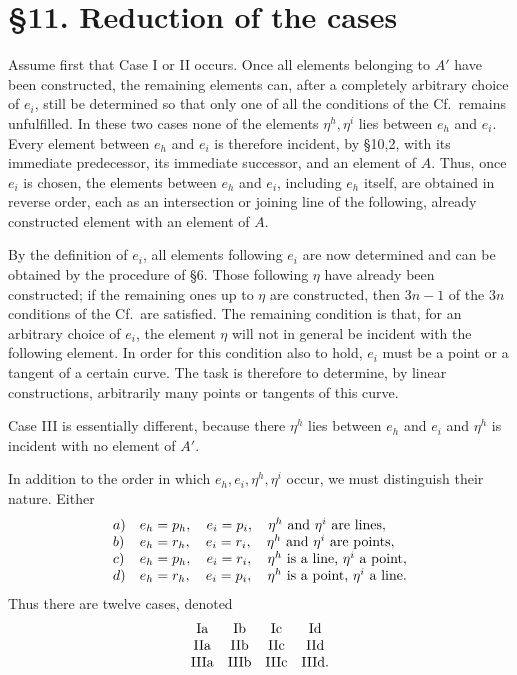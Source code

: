 \documentclass[11pt]{article}
\newcommand{\Cf}{\textup{Cf.}}
\begin{document}
\section*{\S 11. Reduction of the cases}
Assume first that Case I or II occurs. Once all elements belonging to $A'$ have been constructed, the remaining elements can, after a completely arbitrary choice of $e_i$, still be determined so that only one of all the conditions of the \Cf\ remains unfulfilled. In these two cases none of the elements $\eta^h,\eta^i$ lies between $e_h$ and $e_i$. Every element between $e_h$ and $e_i$ is therefore incident, by \S 10,2, with its immediate predecessor, its immediate successor, and an element of $A$. Thus, once $e_i$ is chosen, the elements between $e_h$ and $e_i$, including $e_h$ itself, are obtained in reverse order, each as an intersection or joining line of the following, already constructed element with an element of $A$.

By the definition of $e_i$, all elements following $e_i$ are now determined and can be obtained by the procedure of \S 6. Those following $\eta$ have already been constructed; if the remaining ones up to $\eta$ are constructed, then $3n-1$ of the $3n$ conditions of the \Cf\ are satisfied. The remaining condition is that, for an arbitrary choice of $e_i$, the element $\eta$ will not in general be incident with the following element. In order for this condition also to hold, $e_i$ must be a point or a tangent of a certain curve. The task is therefore to determine, by linear constructions, arbitrarily many points or tangents of this curve.

Case III is essentially different, because there $\eta^h$ lies between $e_h$ and $e_i$ and $\eta^h$ is incident with no element of $A'$.

In addition to the order in which $e_h,e_i,\eta^h,\eta^i$ occur, we must distinguish their nature. Either
\[
\begin{array}{ll}
a)& e_h=p_h,
\quad e_i=p_i,
\quad \eta^h\hbox{ and }\eta^i\hbox{ are lines},\\
b)& e_h=r_h,
\quad e_i=r_i,
\quad \eta^h\hbox{ and }\eta^i\hbox{ are points},\\
c)& e_h=p_h,
\quad e_i=r_i,
\quad \eta^h\hbox{ is a line, }\eta^i\hbox{ a point},\\
d)& e_h=r_h,
\quad e_i=p_i,
\quad \eta^h\hbox{ is a point, }\eta^i\hbox{ a line}.
\end{array}
\]
Thus there are twelve cases, denoted
\[
\begin{array}{cccc}
\mathrm{Ia}&\mathrm{Ib}&\mathrm{Ic}&\mathrm{Id}\cr
\mathrm{IIa}&\mathrm{IIb}&\mathrm{IIc}&\mathrm{IId}\cr
\mathrm{IIIa}&\mathrm{IIIb}&\mathrm{IIIc}&\mathrm{IIId}.
\end{array}
\]
\end{document}

